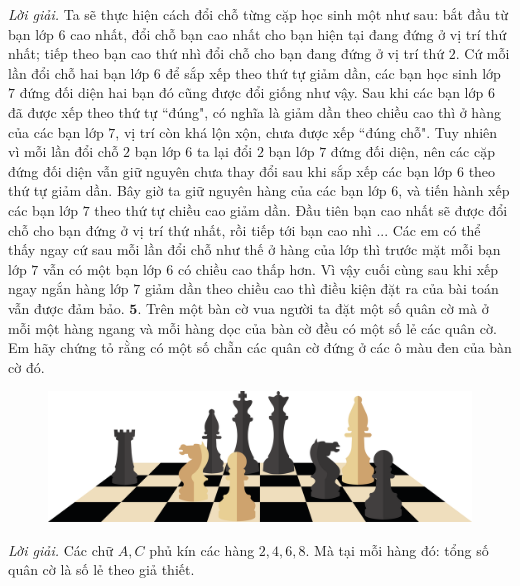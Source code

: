 \begin{multicols}{2}
\begin{figure}[H]
	\end{figure}
	\textit{Lời giải.} Ta sẽ thực hiện cách đổi chỗ từng cặp học sinh một  như sau: bắt đầu từ bạn lớp $6$ cao nhất, đổi chỗ bạn cao nhất cho bạn hiện tại đang đứng ở vị trí thứ nhất; tiếp theo bạn cao thứ nhì đổi chỗ cho bạn đang đứng ở vị trí thứ $2$.  Cứ mỗi lần đổi chỗ hai bạn lớp $6$ để sắp xếp theo thứ tự giảm dần, các bạn học sinh lớp $7$ đứng đối diện hai bạn đó cũng được đổi giống như vậy. Sau khi các bạn lớp $6$ đã được xếp theo thứ tự ``đúng", có nghĩa là giảm dần theo chiều cao thì ở hàng của các bạn lớp $7$, vị trí còn khá lộn xộn, chưa được xếp ``đúng chỗ". Tuy nhiên vì mỗi lần đổi chỗ $2$ bạn lớp $6$ ta lại đổi $2$ bạn lớp $7$ đứng đối diện, nên các cặp đứng đối diện vẫn giữ nguyên chưa thay đổi sau khi sắp xếp các bạn lớp $6$ theo thứ tự giảm dần.
	\vskip 0.1cm
	Bây giờ ta giữ nguyên hàng của các bạn lớp $6$, và tiến hành xếp các bạn lớp $7$ theo thứ tự chiều cao giảm dần. Đầu tiên bạn cao nhất sẽ được đổi chỗ cho bạn đứng ở vị trí thứ nhất, rồi tiếp tới bạn cao nhì ... Các em có thể thấy ngay cứ sau mỗi lần đổi chỗ như thế ở hàng của lớp  thì trước mặt mỗi bạn lớp $7$ vẫn có một bạn lớp $6$ có chiều cao thấp hơn. Vì vậy cuối cùng sau khi xếp ngay ngắn hàng lớp $7$ giảm dần theo chiều cao thì điều kiện đặt ra của bài toán vẫn được đảm bảo.
	\vskip 0.1cm
	$\pmb{5.}$	Trên một bàn cờ vua người ta đặt một số quân cờ mà ở  mỗi một hàng ngang và mỗi hàng dọc của bàn cờ đều có một số lẻ các quân cờ. Em hãy chứng tỏ rằng có một số chẵn các quân cờ đứng ở các ô màu đen của bàn cờ đó.
	\begin{figure}[H]
		\vspace*{-5pt}
		\centering
		\captionsetup{labelformat= empty, justification=centering}
		\includegraphics[width= 1\linewidth]{b2}
		\vspace*{-15pt}
	\end{figure}
	\textit{Lời giải.} Các chữ $A,C$ phủ kín các hàng $2,4,6,8$. Mà tại mỗi hàng đó:  tổng số quân cờ là số lẻ theo giả thiết.
	\begin{figure}[H]
		\centering
		\vspace*{-5pt}
		\captionsetup{labelformat= empty, justification=centering}

\end{figure}
\end{multicols}
